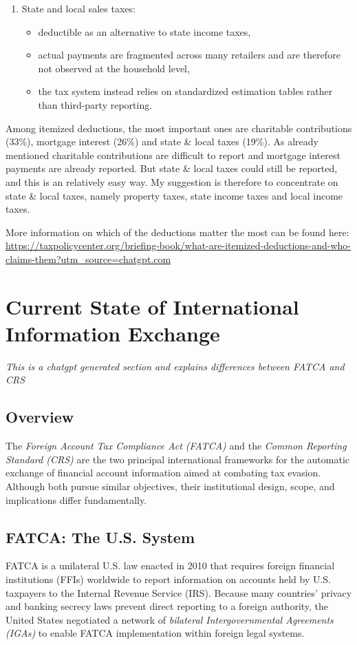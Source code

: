 \documentclass[12pt]{article}
\begin{document}
\begin{enumerate}
\begin{itemize}
    \end{itemize}
    \item State and local sales taxes:
    \begin{itemize}
        \item deductible as an alternative to state income taxes,
        \item actual payments are fragmented across many retailers and are therefore not observed at the household level,
        \item the tax system instead relies on standardized estimation tables rather than third-party reporting.
    \end{itemize}
\end{enumerate}

Among itemized deductions, the most important ones are charitable contributions (33\%), mortgage interest (26\%) and state \& local taxes (19\%). As already mentioned charitable contributions are difficult to report and mortgage interest payments are already reported. But state \& local taxes could still be reported, and this is an relatively easy way.  My suggestion is therefore to concentrate on state \& local taxes, namely property taxes, state income taxes and local income taxes.  

More information on which of the deductions matter the most can be found here: \url{https://taxpolicycenter.org/briefing-book/what-are-itemized-deductions-and-who-claims-them?utm_source=chatgpt.com}

\section{Current State of International Information Exchange}
\textit{This is a chatgpt generated section and explains differences between FATCA and CRS}
\subsection{Overview}
The \textit{Foreign Account Tax Compliance Act (FATCA)} and the \textit{Common Reporting Standard (CRS)} are the two principal international frameworks for the automatic exchange of financial account information aimed at combating tax evasion. Although both pursue similar objectives, their institutional design, scope, and implications differ fundamentally.

\subsection{FATCA: The U.S. System}
FATCA is a unilateral U.S. law enacted in 2010 that requires foreign financial institutions (FFIs) worldwide to report information on accounts held by U.S. taxpayers to the Internal Revenue Service (IRS). Because many countries' privacy and banking secrecy laws prevent direct reporting to a foreign authority, the United States negotiated a network of \textit{bilateral Intergovernmental Agreements (IGAs)} to enable FATCA implementation within foreign legal systems.
\end{document}
